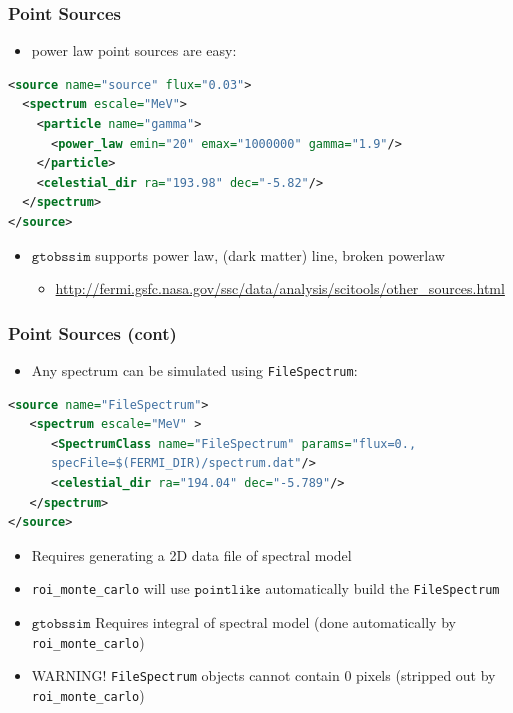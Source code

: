 \documentclass[12pt]{beamer}
\newcommand{\pointlike}{\ensuremath{\mathtt{pointlike}}\xspace}
\newcommand{\gtobssim}{\ensuremath{\mathtt{gtobssim}}\xspace}
\newcommand{\roimc}{\texttt{roi\_monte\_carlo}\xspace}
\begin{document}
\begin{frame}[fragile]
  \frametitle{Point Sources}
  \begin{itemize}
    \item power law point sources are easy:
  \end{itemize}

  \begin{lstlisting}[language=XML]
<source name="source" flux="0.03">
  <spectrum escale="MeV">
    <particle name="gamma">
      <power_law emin="20" emax="1000000" gamma="1.9"/>
    </particle>
    <celestial_dir ra="193.98" dec="-5.82"/>
  </spectrum>
</source>
  \end{lstlisting}

  \begin{itemize}
    \item \gtobssim supports power law, (dark matter) line, broken powerlaw
  \begin{itemize}
    \item \url{http://fermi.gsfc.nasa.gov/ssc/data/analysis/scitools/other_sources.html}
  \end{itemize}
  \end{itemize}
\end{frame}

\begin{frame}[fragile]
  \frametitle{Point Sources (cont)}
  \begin{itemize}
    \item Any spectrum can be simulated using \texttt{FileSpectrum}:
  \end{itemize}

  \begin{lstlisting}[language=XML]
<source name="FileSpectrum">
   <spectrum escale="MeV" >
      <SpectrumClass name="FileSpectrum" params="flux=0.,
      specFile=$(FERMI_DIR)/spectrum.dat"/>
      <celestial_dir ra="194.04" dec="-5.789"/>
   </spectrum>
</source>
  \end{lstlisting}

  \begin{itemize}
    \item Requires generating a 2D data file of spectral model
    \item \roimc will use \pointlike automatically build the \texttt{FileSpectrum} 
    \item \gtobssim Requires integral of spectral model (done automatically by \roimc)
    \item WARNING! \texttt{FileSpectrum} objects cannot contain 0 pixels (stripped out by \roimc)
  \end{itemize}
\end{frame}
\end{document}
